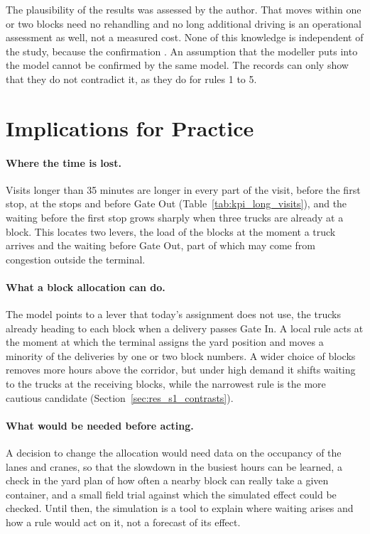  The plausibility
of the results was  assessed by the author. That moves within one or
two blocks need no rehandling and no long additional driving is an operational
assessment as well, not a measured cost. None of this knowledge is independent of the
study, because the confirmation . An assumption that the modeller puts into the model cannot be confirmed by
the same model. The records can only show that they do not contradict it, as they do
for rules 1 to 5.

\section{Implications for Practice}
\label{sec:disc_practice}

\paragraph{Where the time is lost.} Visits longer than 35 minutes are longer in every
part of the visit, before the first stop, at the stops and before Gate Out
(Table~\ref{tab:kpi_long_visits}), and the waiting before the first stop grows
sharply when three trucks are already at a block. This locates two levers, the load
of the blocks at the moment a truck arrives and the waiting before Gate Out, part of
which may come from congestion outside the terminal.

\paragraph{What a block allocation can do.} The model points to a lever that
today's assignment does not use, the trucks already heading to each block when a
delivery passes Gate In. A local rule acts at the moment at which the terminal
assigns the yard position and moves a minority of the deliveries by one or two block
numbers. A wider choice of blocks removes more hours above the corridor, but under
high demand it shifts waiting to the trucks at the receiving blocks, while the
narrowest rule is the more cautious candidate (Section~\ref{sec:res_s1_contrasts}).

\paragraph{What would be needed before acting.} A decision to change the allocation
would need data on the occupancy of the lanes and cranes, so that the slowdown in the
busiest hours can be learned, a check in the yard plan of how often a nearby block can
really take a given container, and a small field trial against which the simulated
effect could be checked. Until then, the simulation is a tool to explain where
waiting arises and how a rule would act on it, not a forecast of its effect.
